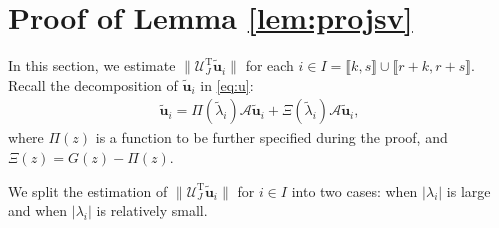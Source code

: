 \documentclass[reqno]{amsart}
\newcommand{\T}{\mathrm{T}}
\theoremstyle{plain}
\theoremstyle{definition}
\begin{document}
 
\section{Proof of Lemma \ref{lem:projsv}}\label{app:bdeach}
In this section, we estimate $\| \mathcal U_J^\T \widetilde{\mathbf u}_i \|$ for each $i \in I=\llbracket k, s\rrbracket \cup \llbracket r+k, r+s\rrbracket$. Recall the decomposition of $\widetilde{\mathbf u}_i$ in \eqref{eq:u}:
\begin{align}\label{eq:u2}
\widetilde{\mathbf u}_i=\Pi(\widetilde \lambda_i) \mathcal A \widetilde{\mathbf u}_i + \Xi(\widetilde \lambda_i) \mathcal A \widetilde{\mathbf u}_i,
\end{align}
where $\Pi(z)$ is a function to be further specified during the proof, and $\Xi(z)=G(z)-\Pi(z)$.

We split the estimation of $\| \mathcal U_J^\T \widetilde{\mathbf u}_i \|$ for $i\in I$ into two cases: when $|\lambda_i|$ is large and when $|\lambda_i|$ is relatively small. 
\end{document}

